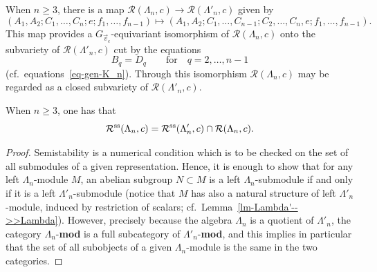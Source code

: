 When $n\geq 3$, there is a map $\mathcal{R}(\Lambda_{n}, c) \longrightarrow \mathcal{R}(\Lambda'_{n}, c)$ given by
\begin{equation*}
(A_1,A_2;C_1,\dots,C_n;e;f_1,\dots,f_{n-1}) \mapsto
(A_1,A_2;C_1,\dots,C_{n-1};C_{2},\dots,C_{n},e;f_1,\dots,f_{n-1}) .
\end{equation*}
This map provides a $G_{\vec{v}_{c}}$-equivariant isomorphism of $\mathcal{R}(\Lambda_{n}, c)$ onto the subvariety of $\mathcal{R}(\Lambda'_{n}, c)$ cut by the equations
\begin{equation*}
B_{q}=D_{q}\qquad\text{for}\quad q=2,\dots,n-1
\end{equation*}
(cf.\ equations~\eqref{eq-gen-K_n}). Through this isomorphism $\mathcal{R}(\Lambda_{n}, c)$ may be regarded as a closed subvariety of $\mathcal{R}(\Lambda'_{n}, c)$.
\begin{Lemma}\label{lm-R_n(c)-in-R'_n(c)}
When $n\geq 3$, one has that
\begin{equation*}
\mathcal{R}^{\rm ss}(\Lambda_{n}, c) =\mathcal{R}^{\rm ss}(\Lambda'_{n}, c) \cap \mathcal{R}(\Lambda_{n}, c) .
\end{equation*}
\end{Lemma}
\begin{proof}Semistability is a numerical condition which is to be checked on the set of all submodules of a given representation. Hence, it is enough to show that for any left $\Lambda_{n}$-module $M$, an abelian subgroup $N\subset M$ is a left $\Lambda_{n}$-submodule if and only if it is a left $\Lambda'_{n}$-submodule (notice that $M$ has also a natural structure of left $\Lambda'_{n}$-module, induced by restriction of scalars; cf.\ Lemma~\ref{lm-Lambda'-->>Lambda}).
However, precisely because the algebra $\Lambda_n$ is a quotient of $\Lambda'_n$,
the category $\Lambda_{n}$-{\bf mod} is a full subcategory of $\Lambda'_{n}$-{\bf mod}, and this implies in particular that the set of all subobjects of a given $\Lambda_n$-module is the same in the two categories.
\end{proof}

